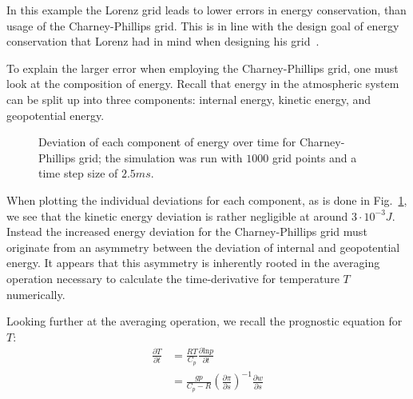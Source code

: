 In this example the Lorenz grid leads to lower errors in energy conservation, than usage of the Charney-Phillips grid.
This is in line with the design goal of energy conservation that Lorenz had in mind when designing his grid~\cite{lorenz1960energy}.

To explain the larger error when employing the Charney-Phillips grid, one must look at the composition of energy.
Recall that energy in the atmospheric system can be split up into three components: internal energy, kinetic energy, and geopotential energy.

\begin{figure}[!h]
    \caption{Deviation of each component of energy over time for Charney-Phillips grid;
    the simulation was run with $1000$ grid points and a time step size of $2.5ms$.
    }
    \label{fig:cp_energy_split}
\end{figure}

When plotting the individual deviations for each component, as is done in Fig.~\ref{fig:cp_energy_split}, we see that the kinetic energy deviation is rather negligible at around $3\cdot10^{-3}J$.
Instead the increased energy deviation for the Charney-Phillips grid must originate from an asymmetry between the deviation of internal and geopotential energy.
It appears that this asymmetry is inherently rooted in the averaging operation necessary to calculate the time-derivative for temperature $T$ numerically.

Looking further at the averaging operation, we recall the prognostic equation for $T$:
\begin{align*}
\frac{\partial T}{\partial t} &= \frac{RT}{C_p}\frac{\partial \text{ln}p}{\partial t}\\
&=\frac{gp}{C_p-R}\left(\frac{\partial \pi}{\partial s}\right)^{-1} \frac{\partial w}{\partial s}
\end{align*}

